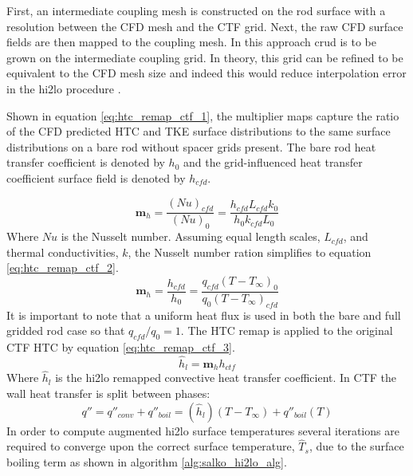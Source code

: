     First, an intermediate coupling mesh is constructed on the rod surface with a resolution between the CFD mesh and the CTF grid.  Next, the raw CFD surface fields are then mapped to the coupling mesh.  In this approach crud is to be grown on the intermediate coupling grid.  In theory, this grid can be refined to be equivalent to the CFD mesh size and indeed this would reduce interpolation error in the hi2lo procedure \cite{salko17}.
       
    Shown in equation \ref{eq:htc_remap_ctf_1},  the multiplier maps capture the ratio of the CFD predicted HTC and TKE surface distributions to the same surface distributions on a bare rod without spacer grids present.  The bare rod heat transfer coefficient is denoted by $h_0$ and the grid-influenced heat transfer coefficient surface field is denoted by $h_{cfd}$.
    
    \begin{equation}
        \mathbf m_h = \frac{(Nu)_{cfd}}{(Nu)_{0}} = \frac{h_{cfd} L_{cfd} k_{0} }{h_{0}k_{cfd} L_{0}}
         \label{eq:htc_remap_ctf_1}
    \end{equation}
    Where $Nu$ is the Nusselt number.  Assuming equal length scales, $L_{cfd}$, and thermal conductivities, $k$, the Nusselt number ration simplifies to equation \ref{eq:htc_remap_ctf_2}.
    \begin{equation}
        \mathbf m_h = \frac{h_{cfd}}{h_{0}} = \frac{q_{cfd}(T-T_\infty)_{0}}{q_{0}(T-T_\infty)_{cfd}}
        \label{eq:htc_remap_ctf_2}
    \end{equation}
    It is important to note that a uniform heat flux is used in both the bare and full gridded rod case so that $q_{cfd}/q_0 =1 $.
    The HTC remap is applied to the original CTF HTC by equation \ref{eq:htc_remap_ctf_3}.
    \begin{equation}
        \hat h_{l} = \mathbf m_h h_{ctf}
        \label{eq:htc_remap_ctf_3}
    \end{equation}
    Where $\hat h_l$ is the hi2lo remapped convective heat transfer coefficient.  In CTF the wall heat transfer is split between phases:
    \begin{equation}
        q'' = q''_{conv} + q''_{boil} = (\hat h_l)(T-T_{\infty}) + q''_{boil}(T)
    \end{equation}
    In order to compute augmented hi2lo surface temperatures
    several iterations are required to converge upon the correct surface temperature, $\hat T_s$, due to the surface boiling term as shown in algorithm \ref{alg:salko_hi2lo_alg}.  

